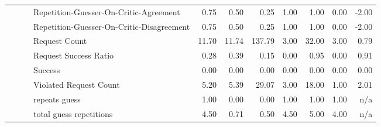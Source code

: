 \begin{tabular}{llllrrrrrrr}
 &  &  & Repetition-Guesser-On-Critic-Agreement & 0.75 & 0.50 & 0.25 & 1.00 & 1.00 & 0.00 & -2.00 \\
 &  &  & Repetition-Guesser-On-Critic-Disagreement & 0.75 & 0.50 & 0.25 & 1.00 & 1.00 & 0.00 & -2.00 \\
 &  &  & Request Count & 11.70 & 11.74 & 137.79 & 3.00 & 32.00 & 3.00 & 0.79 \\
 &  &  & Request Success Ratio & 0.28 & 0.39 & 0.15 & 0.00 & 0.95 & 0.00 & 0.91 \\
 &  &  & Success & 0.00 & 0.00 & 0.00 & 0.00 & 0.00 & 0.00 & 0.00 \\
 &  &  & Violated Request Count & 5.20 & 5.39 & 29.07 & 3.00 & 18.00 & 1.00 & 2.01 \\
 &  &  & repeats guess & 1.00 & 0.00 & 0.00 & 1.00 & 1.00 & 1.00 & n/a \\
 &  &  & total guess repetitions & 4.50 & 0.71 & 0.50 & 4.50 & 5.00 & 4.00 & n/a \\
\cline{1-11} \cline{2-11} \cline{3-11}
\bottomrule
\end{tabular}
